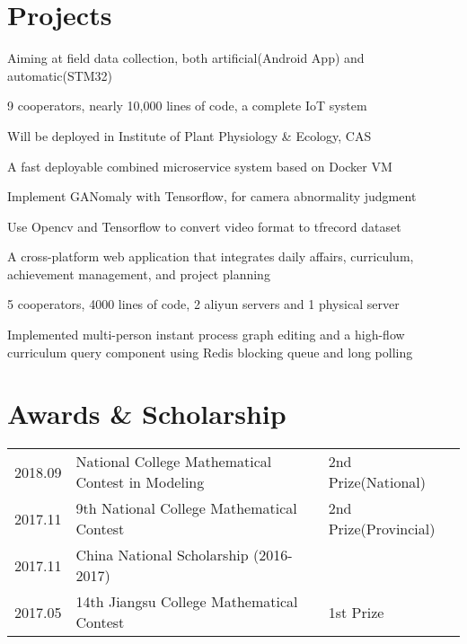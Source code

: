 \documentclass[]{deedy-resume-openfont}
\begin{document}
\begin{minipage}[t]{0.76\textwidth}
\section{Projects}
    \begin{tightemize}
        \item Aiming at field data collection, both artificial(Android App) and automatic(STM32)
        \item 9 cooperators, nearly 10,000 lines of code, a complete IoT system
		\item Will be deployed in Institute of Plant Physiology \& Ecology, CAS
		\item A fast deployable combined microservice system based on Docker VM
	\end{tightemize}
	\sectionsep

	\begin{tightemize}
		\item Implement GANomaly with Tensorflow, for camera abnormality judgment
		\item Use Opencv and Tensorflow to convert video format to tfrecord dataset
	\end{tightemize}
    \sectionsep
    
	\begin{tightemize}
		\item A cross-platform web application that integrates daily affairs, curriculum, achievement management, and project planning
		\item 5 cooperators, 4000 lines of code, 2 aliyun servers and 1 physical server
		\item Implemented multi-person instant process graph editing and a high-flow curriculum query component using Redis blocking queue and long polling
	\end{tightemize}
	\sectionsep

\section{Awards \& Scholarship} 
\begin{tabular}{lll}
    2018.09 & National College Mathematical Contest in Modeling & 2nd Prize(National) \\
    2017.11 & 9th National College Mathematical Contest & 2nd Prize(Provincial) \\
    2017.11 & China National Scholarship (2016-2017) & \\
    2017.05 & 14th Jiangsu College Mathematical Contest & 1st Prize\\
\end{tabular}
\sectionsep

\end{minipage} 
\end{document}
